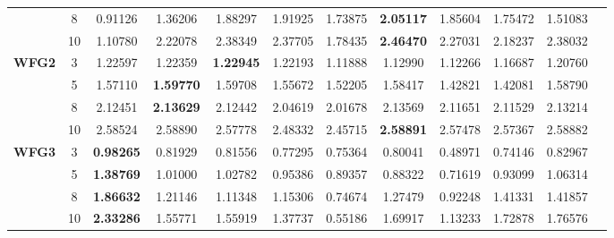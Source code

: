 \documentclass{sig-alternate}
\begin{document}
\begin{table}[!htb]
\begin{tabular}{|c|c|c|c|c|c|c|c|c|c|c|c|}
		& 8          & 0.91126          & 1.36206           & 1.88297               & 1.91925          & 1.73875             & \textbf{2.05117}    & 1.85604            & 1.75472              & 1.51083          \\ \cline{2-11} 
		& 10         & 1.10780          & 2.22078           & 2.38349               & 2.37705          & 1.78435             & \textbf{2.46470}    & 2.27031            & 2.18237              & 2.38032          \\ \hline
		\multirow{4}{*}{\textbf{WFG2}}  & 3          & 1.22597          & 1.22359           & \textbf{1.22945}      & 1.22193          & 1.11888             & 1.12990             & 1.12266            & 1.16687              & 1.20760          \\ \cline{2-11} 
		& 5          & 1.57110          & \textbf{1.59770}  & 1.59708               & 1.55672          & 1.52205             & 1.58417             & 1.42821            & 1.42081              & 1.58790          \\ \cline{2-11} 
		& 8          & 2.12451          & \textbf{2.13629}  & 2.12442               & 2.04619          & 2.01678             & 2.13569             & 2.11651            & 2.11529              & 2.13214          \\ \cline{2-11} 
		& 10         & 2.58524          & 2.58890           & 2.57778               & 2.48332          & 2.45715             & \textbf{2.58891}    & 2.57478            & 2.57367              & 2.58882          \\ \hline
		\multirow{4}{*}{\textbf{WFG3}}  & 3          & \textbf{0.98265} & 0.81929           & 0.81556               & 0.77295          & 0.75364             & 0.80041             & 0.48971            & 0.74146              & 0.82967          \\ \cline{2-11} 
		& 5          & \textbf{1.38769} & 1.01000           & 1.02782               & 0.95386          & 0.89357             & 0.88322             & 0.71619            & 0.93099              & 1.06314          \\ \cline{2-11} 
		& 8          & \textbf{1.86632} & 1.21146           & 1.11348               & 1.15306          & 0.74674             & 1.27479             & 0.92248            & 1.41331              & 1.41857          \\ \cline{2-11} 
		& 10         & \textbf{2.33286} & 1.55771           & 1.55919               & 1.37737          & 0.55186             & 1.69917             & 1.13233            & 1.72878              & 1.76576          \\ \hline

\end{tabular}
\end{table}
\end{document}
